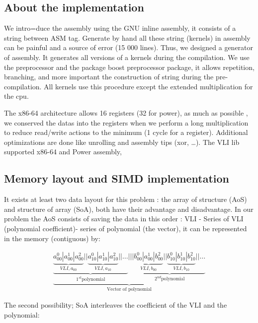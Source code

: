 \documentclass[11pt]{amsart}
\begin{document}
\subsection*{About the implementation}

We intro=duce the assembly using the GNU inline assembly, it consists of a string between ASM tag.
Generate by hand all these  string (kernels) in assembly can be painful and a source of error (15 000 lines). 
Thus, we designed a generator of assembly. It generates all versions of a kernels during the compilation.   
We use the preprocessor and the package boost preprocessor package, it allows repetition, branching, and more
 important the construction of string during the pre-compilation.  All kernels use this procedure except the extended multiplication for the cpu.

The x86-64 architecture allows 16 registers (32 for power), as much as possible , we conserved the datas into the registers when we perform a long multiplication to reduce read/write actions to the minimum (1 cycle for a register).
Additional optimizations are done like unrolling and assembly tips (xor,  \dots).  The VLI lib supported  x86-64 and Power assembly,

\subsection*{Memory layout and SIMD implementation}

It exists at least two data layout for this problem : the array of structure (AoS) and structure of array (SoA), both have their advantage and disadvantage. In our problem the AoS consists of saving the data in this order  : VLI - Series of VLI (polynomial coefficient)- series of polynomial (the vector), it can be represented in the memory (contiguous) by:

\begin{eqnarray}
 \underbrace{
 \underbrace{ \underbrace{a^0_{00} | a^1_{00} | a^2_{00}}_{VLI, a_{00} } || \underbrace{a^0_{10} | a^1_{10} | a^2_{10}}_{VLI, a_{10}} ||   \dots  }_{1^{st} \textrm{polynomial}} 
      |||    \underbrace{ \underbrace{b^0_{00} | a^1_{00} | b^2_{00}}_{VLI, b_{00} } || \underbrace{b^0_{10} | b^1_{10} | b^2_{10}}_{VLI, b_{10}} ||   \dots  }_{2^{nd} \textrm{polynomial} } }_{\textrm{Vector of polynomial}} \nonumber
\end{eqnarray}

The second possibility; SoA interleaves the coefficient of the VLI and the polynomial:
\end{document}
